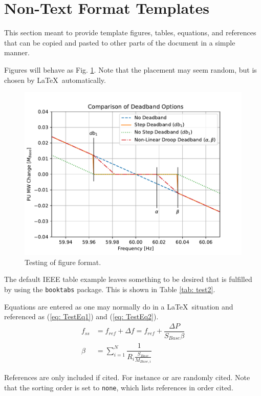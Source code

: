 \section{Non-Text Format Templates}
This section meant to provide template figures, tables, equations, and references that can be copied and pasted to other parts of the document in a simple manner.

Figures will behave as Fig. \ref{fig: test}. Note that the placement may seem random, but is chosen by \LaTeX\ automatically.
\begin{figure}[!ht]
\centering
\includegraphics[width=\linewidth]{figures/dbAction3}
\caption{Testing of figure format.}
\label{fig: test}
\end{figure}


The default IEEE table example leaves something to be desired that is fulfilled by using the \verb|booktabs| package.
This is shown in Table \ref{tab: test2}.


Equations are entered as one may normally do in a \LaTeX\ situation and referenced as (\ref{eq: TestEq1}) and (\ref{eq: TestEq2}).
\begin{align}
f_{ss} &= f_{ref}+\Delta f = f_{ref} + \dfrac{\Delta P}{S_{Base}\beta}  \label{eq: TestEq1}\\
\beta &= \sum_{i=1}^{N} \dfrac{1}{R_i \frac{S_{Base}}{M_{Base, i}} } \label{eq: TestEq2}
\end{align}

References are only included if cited. For instance \cite{Kundur} or \cite{DonnellyVoltageControl} are randomly cited. Note that the sorting order is set to \verb|none|, which lists references in order cited.
